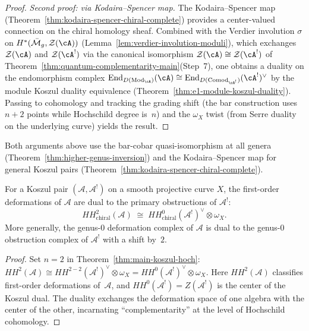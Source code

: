 \begin{proof}
\medskip\noindent\emph{Second proof: via Kodaira--Spencer map.}
The Kodaira--Spencer map
(Theorem~\ref{thm:kodaira-spencer-chiral-complete}) provides a
center-valued connection on the chiral homology sheaf.  Combined with the
Verdier involution $\sigma$ on $H^*(\bar{\mathcal{M}}_g, \mathcal{Z}(\cA))$
(Lemma~\ref{lem:verdier-involution-moduli}), which exchanges
$\mathcal{Z}(\cA)$ and $\mathcal{Z}(\cA^!)$ via the canonical isomorphism
$\mathcal{Z}(\cA) \cong \mathcal{Z}(\cA^!)$ of
Theorem~\ref{thm:quantum-complementarity-main}(Step~7), one obtains
a duality on the endomorphism complex
$\mathrm{End}_{D(\mathrm{Mod}_{\cA})}(\cA) \cong
\mathrm{End}_{D(\mathrm{Comod}_{\cA^!})}(\cA^!)^{\vee}$
by the module Koszul duality equivalence
(Theorem~\ref{thm:e1-module-koszul-duality}).
Passing to cohomology and tracking the grading shift
(the bar construction uses $n+2$ points while Hochschild degree is~$n$)
and the $\omega_X$ twist (from Serre duality on the underlying curve) yields the result.
\end{proof}

\begin{remark}
Both arguments above use the bar-cobar quasi-isomorphism at all genera
(Theorem~\ref{thm:higher-genus-inversion}) and the Kodaira--Spencer map
for general Koszul pairs
(Theorem~\ref{thm:kodaira-spencer-chiral-complete}).
\end{remark}

\begin{corollary}\label{cor:def-obs-exchange-genus0}
For a Koszul pair $(\mathcal{A}, \mathcal{A}^!)$ on a smooth projective curve $X$, the first-order deformations of $\mathcal{A}$ are dual to the primary obstructions of $\mathcal{A}^!$:
\begin{equation}\label{eq:def-obs-genus0}
HH^2_{\mathrm{chiral}}(\mathcal{A}) \;\cong\; HH^0_{\mathrm{chiral}}(\mathcal{A}^!)^{\vee} \otimes \omega_X.
\end{equation}
More generally, the genus-$0$ deformation complex of $\mathcal{A}$ is dual to the genus-$0$ obstruction complex of $\mathcal{A}^!$ with a shift by~$2$.
\end{corollary}

\begin{proof}
Set $n = 2$ in Theorem~\ref{thm:main-koszul-hoch}: $HH^2(\mathcal{A}) \cong HH^{2-2}(\mathcal{A}^!)^\vee \otimes \omega_X = HH^0(\mathcal{A}^!)^\vee \otimes \omega_X$.  Here $HH^2(\mathcal{A})$ classifies first-order deformations of~$\mathcal{A}$, and $HH^0(\mathcal{A}^!) = Z(\mathcal{A}^!)$ is the center of the Koszul dual.  The duality exchanges the deformation space of one algebra with the center of the other, incarnating ``complementarity'' at the level of Hochschild cohomology.
\end{proof}


